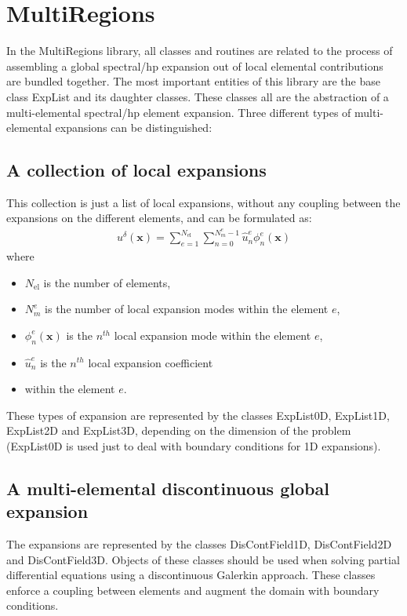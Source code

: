 \section{MultiRegions}
In the MultiRegions library, all classes and routines are related to the
process of assembling a global spectral/hp expansion out of local elemental
contributions are bundled together. The most important entities of this library
are the base class ExpList and its daughter classes. These classes all are the
abstraction of a multi-elemental spectral/hp element expansion. Three different
types of multi-elemental expansions can be distinguished:

\subsection{A collection of local expansions}
This collection is just a list of local expansions, without any coupling between
the expansions on the different elements, and can be formulated as:
\begin{align*}
u^{\delta}(\boldsymbol{x})=\sum_{e=1}^{{N_{\mathrm{el}}}}\sum_{n=0}^{N^{e}_m-1}\hat{u}_n^e\phi_n^e(\boldsymbol{x})
\end{align*}
where
\begin{itemize}
\item ${N_{\mathrm{el}}}$ is the number of elements, 
\item $N^{e}_m$ is the number of local expansion modes within the
element $e$, 
\item $\phi_n^e(\boldsymbol{x})$ is the $n^{th}$ local expansion mode within
the element $e$, 
\item $\hat{u}_n^e$ is the $n^{th}$ local expansion coefficient 
\item within the element $e$.
\end{itemize}

These types of expansion are represented by the classes ExpList0D, ExpList1D,
ExpList2D and ExpList3D, depending on the dimension of the problem (ExpList0D is
used just to deal with boundary conditions for 1D expansions).

\subsection{A multi-elemental discontinuous global expansion}
The expansions are represented by the classes DisContField1D, DisContField2D and
DisContField3D. Objects of these classes should be used when solving partial
differential equations using a discontinuous Galerkin approach. These classes
enforce a coupling between elements and augment the domain with boundary
conditions.


